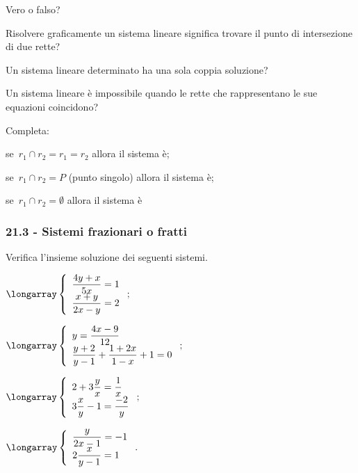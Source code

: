 \begin{esercizio}
 \label{ese:21.44}
Vero o falso?
\TabPositions{11cm}
 \begin{enumeratea}
\item Risolvere graficamente un sistema lineare significa trovare il punto di intersezione di due rette? \tab\boxV\quad\boxF
\item Un sistema lineare determinato ha una sola coppia soluzione?\tab\boxV\quad\boxF
\item Un sistema lineare è impossibile quando le rette che rappresentano le sue equazioni coincidono?\tab\boxV\quad\boxF
\end{enumeratea}
\end{esercizio}

\begin{esercizio}
 \label{ese:21.45}
Completa:

\begin{itemize*}
\item se~$r_{1}\cap r_{2}=r_{1}=r_{2}$ allora il sistema è\dotfill;
\item se~$r_{1}\cap r_{2}=P$ (punto singolo) allora il sistema è\dotfill;
\item se~$r_{1}\cap r_{2}=\emptyset $ allora il sistema è\dotfill
\end{itemize*}
\end{esercizio}
\pagebreak
\subsubsection*{21.3 - Sistemi frazionari o fratti}

\begin{esercizio}[\Ast]
 \label{ese:21.46}
Verifica l'insieme soluzione dei seguenti sistemi.
\begin{multicols}{2}
\begin{enumeratea}
\item $\longarray\left\{\begin{array}{l}\dfrac{4y+x}{5x}=1\\\dfrac{x+y}{2x-y}=2\end{array}\right.;$
\item $\longarray\left\{\begin{array}{l}y=\dfrac{4x-9}{12}\\{\dfrac{y+2}{y-1}+\dfrac{1+2x}{1-x}+1=0}\end{array}\right.;$
\item $\longarray\left\{\begin{array}{l}2+3\dfrac{y}{x}=\dfrac{1}{x}\\3\dfrac{x}{y}-1=\dfrac{-2}{y} \end{array}\right.;$
\item $\longarray\left\{\begin{array}{l}\dfrac{y}{2x-1}=-1\\2\dfrac{x}{y-1}=1\end{array}\right..$
\end{enumeratea}
\end{multicols}
\end{esercizio}

